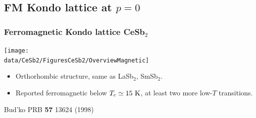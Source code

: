 
\subsection{FM Kondo lattice at $p=0$}
\begin{frame}[label=CeSb2Intro]
\frametitle{Ferromagnetic Kondo lattice CeSb$_2$}
\centerline{\texttt{[image: \\data/CeSb2/FiguresCeSb2/OverviewMagnetic]}}

\vspace{1.5em}
\begin{itemize}
\item Orthorhombic structure, same as LaSb$_2$, SmSb$_2$.

\item Reported ferromagnetic below $T_c \simeq 15~\rm K$, at least two more low-$T$ transitions.
%
\end{itemize}

\vspace{3 em}
\centerline{\makebox[\linewidth]{\rule{0.85\textwidth}{0.4pt}}}

\centerline{\scriptsize Bud'ko PRB {\bf 57} 13624 (1998)}
\end{frame}


